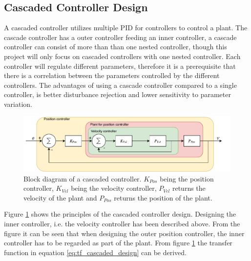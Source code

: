 \documentclass[../../main.tex]{subfiles}
\begin{document}


\subsection{Cascaded Controller Design}
A cascaded controller utilizes multiple PID for controllers to control a plant. The cascade controller has a outer controller feeding an inner controller, a cascade controller can consist of more than than one nested controller, though this project will only focus on cascaded controllers with one nested controller. Each controller will regulate different parameters, therefore it is a prerequisite that there is a correlation between the parameters controlled by the different controllers. The advantages of using a cascade controller compared to a single controller, is better disturbance rejection and lower sensitivity to parameter variation. 
\begin{figure}[H]
    \centering
    \includegraphics[width = 0.7 \textwidth]{Sections/System_Design/Images/cascade_controller.pdf}
    \caption{Block diagram of a cascaded controller. $K_{Pos}$ being the position controller, $K_{Vel}$ being the velocity controller, $P_{Vel}$ returns the velocity of the plant and $P_{Pos}$ returns the position of the plant.}
    \label{fig:cascaded_design}
\end{figure}
Figure \ref{fig:cascaded_design} shows the principles of the cascaded controller design. Designing the inner controller, i.e. the velocity controller has been described above. From the figure it can be seen that when designing the outer position controller, the inner controller has to be regarded as part of the plant. From figure \ref{fig:cascaded_design} the transfer function in equation \ref{eq:tf_cascaded_design} can be derived.
\end{document}
